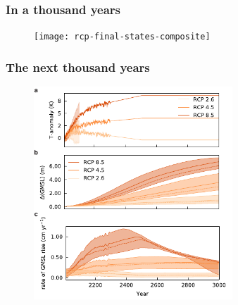 \documentclass[hide notes,intlimits]{beamer}
\begin{document}
\begin{frame}
  \frametitle{In a thousand years}
  \begin{figure}
    \texttt{[image: rcp-final-states-composite]}
  \end{figure}
\end{frame}

\begin{frame}
  \frametitle{The next thousand years}
  \begin{figure}
    \includegraphics[height=8cm]{les-composite}
  \end{figure}
\end{frame}
\end{document}
